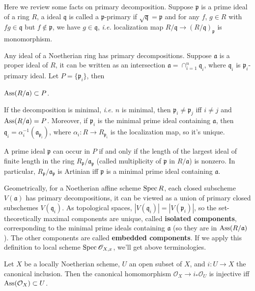 \begin{supply}
Here we review some facts on primary decomposition. Suppose $\mathfrak p$ is a prime
ideal of a ring $R$, a ideal $\mathfrak q$ is called a $\mathfrak p$-primary 
if $\sqrt{\mathfrak q}=\mathfrak p$ and for any $f$, $g\in R$ with $fg\in \mathfrak q$
but $f\not\in \mathfrak p$, we have $g\in \mathfrak q$, \textit{i.e.}
localization map $R/\mathfrak q\to (R/\mathfrak q)_{\mathfrak p}$ is monomorphism.

Any ideal of a Noetherian ring has primary decompositions. Suppose $\mathfrak a$ is a 
proper ideal of $R$, it can be written as an intersection $\mathfrak a=\cap_{i=1}^n 
\mathfrak q_i$, where $\mathfrak q_i$ is $\mathfrak p_i$-primary ideal. Let 
$P=\{\mathfrak p_i\}$, then 
\begin{compactenum}
\item $\operatorname{Ass}(R/\mathfrak a)\subset P$.
\item If the decomposition is minimal, \emph{i.e.} $n$ is minimal, then 
	$\mathfrak p_i\neq \mathfrak p_j$ iff $i\neq j$ and $\operatorname{Ass}(R/\mathfrak a)=P$. 
	Moreover, if $\mathfrak p_i$ is the minimal prime ideal containing $\mathfrak a$,
	then $\mathfrak q_i=\alpha_i^{-1}(\mathfrak a_{\mathfrak p_i})$, where 
	$\alpha_i:R\to R_{\mathfrak p_i}$ is the localization map, so it's unique.
\end{compactenum}
A prime ideal $\mathfrak p$ can occur in $P$ if and only if the length of the largest 
ideal of finite length in the ring $R_{\mathfrak p}/\mathfrak a_{\mathfrak p}$ (called
multiplicity of $\mathfrak p$ in $R/\mathfrak a$) is nonzero.
In particular, $R_{\mathfrak p}/\mathfrak a_{\mathfrak p}$ is Artinian iff $\mathfrak p$
is a minimal prime ideal containing $\mathfrak a$.

Geometrically, for a Noetherian affine scheme $\operatorname{Spec} R$, each closed subscheme 
$V(\mathfrak a)$ has primary decompositions, it can be viewed as a union of 
primary closed subschemes $V(\mathfrak q_i)$. As topological spaces,
$|V(\mathfrak q_i)|=|V(\mathfrak p_i)|$, so the set-theoretically maximal 
components are unique, called \textbf{isolated components}, corresponding to
the minimal prime ideals containing $\mathfrak a$ (so they are in $\operatorname{Ass}(R/\mathfrak a)$).
The other components are called \textbf{embedded components}. If we apply this definition
to local scheme $\operatorname{Spec} \mathscr O_{X,x}$, we'll get above terminologies.
\end{supply}


\begin{lem}
Let $X$ be a locally Noetherian scheme, $U$ an open subset of $X$, and 
$i:U\to X$ the canonical inclusion. Then the canonical homomorphism 
$\mathcal O_X\to i_*\mathcal O_U$ is injective iff $\operatorname{Ass}(\mathcal O_X)\subset U$.
\end{lem}

